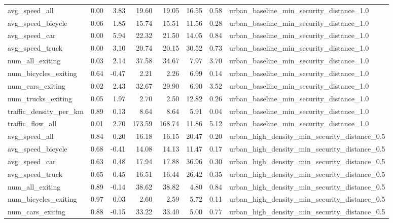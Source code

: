 \begin{table}[ht]
\begin{tabular}{lrrrrrrl}
  avg\_speed\_all & 0.00 & 3.83 & 19.60 & 19.05 & 16.55 & 0.58 & urban\_baseline\_min\_security\_distance\_1.0 \\ 
  avg\_speed\_bicycle & 0.06 & 1.85 & 15.74 & 15.51 & 11.56 & 0.28 & urban\_baseline\_min\_security\_distance\_1.0 \\ 
  avg\_speed\_car & 0.00 & 5.94 & 22.32 & 21.50 & 14.05 & 0.84 & urban\_baseline\_min\_security\_distance\_1.0 \\ 
  avg\_speed\_truck & 0.00 & 3.10 & 20.74 & 20.15 & 30.52 & 0.73 & urban\_baseline\_min\_security\_distance\_1.0 \\ 
  num\_all\_exiting & 0.03 & 2.14 & 37.58 & 34.67 & 7.97 & 3.70 & urban\_baseline\_min\_security\_distance\_1.0 \\ 
  num\_bicycles\_exiting & 0.64 & -0.47 & 2.21 & 2.26 & 6.99 & 0.14 & urban\_baseline\_min\_security\_distance\_1.0 \\ 
  num\_cars\_exiting & 0.02 & 2.43 & 32.67 & 29.90 & 6.90 & 3.52 & urban\_baseline\_min\_security\_distance\_1.0 \\ 
  num\_trucks\_exiting & 0.05 & 1.97 & 2.70 & 2.50 & 12.82 & 0.26 & urban\_baseline\_min\_security\_distance\_1.0 \\ 
  traffic\_density\_per\_km & 0.89 & 0.13 & 8.64 & 8.64 & 5.91 & 0.04 & urban\_baseline\_min\_security\_distance\_1.0 \\ 
  traffic\_flow\_all & 0.01 & 2.70 & 173.59 & 168.74 & 11.86 & 5.12 & urban\_baseline\_min\_security\_distance\_1.0 \\ 
  avg\_speed\_all & 0.84 & 0.20 & 16.18 & 16.15 & 20.47 & 0.20 & urban\_high\_density\_min\_security\_distance\_0.5 \\ 
  avg\_speed\_bicycle & 0.68 & -0.41 & 14.08 & 14.13 & 11.47 & 0.17 & urban\_high\_density\_min\_security\_distance\_0.5 \\ 
  avg\_speed\_car & 0.63 & 0.48 & 17.94 & 17.88 & 36.96 & 0.30 & urban\_high\_density\_min\_security\_distance\_0.5 \\ 
  avg\_speed\_truck & 0.65 & 0.45 & 16.51 & 16.44 & 26.42 & 0.35 & urban\_high\_density\_min\_security\_distance\_0.5 \\ 
  num\_all\_exiting & 0.89 & -0.14 & 38.62 & 38.82 & 4.80 & 0.84 & urban\_high\_density\_min\_security\_distance\_0.5 \\ 
  num\_bicycles\_exiting & 0.97 & 0.03 & 2.60 & 2.59 & 5.72 & 0.11 & urban\_high\_density\_min\_security\_distance\_0.5 \\ 
  num\_cars\_exiting & 0.88 & -0.15 & 33.22 & 33.40 & 5.00 & 0.77 & urban\_high\_density\_min\_security\_distance\_0.5 \\ 

\end{tabular}
\end{table}
